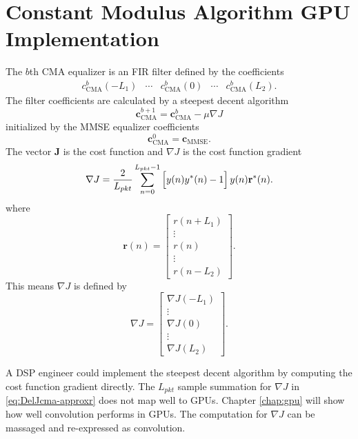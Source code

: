 \section{Constant Modulus Algorithm GPU Implementation}

The $b$th CMA equalizer is an FIR filter defined by the coefficients
\begin{equation}
\begin{matrix}
c_\text{CMA}^b(-L_1) & \cdots & c_\text{CMA}^b(0) & \cdots & c_\text{CMA}^b(L_2).
\end{matrix}
\end{equation}
The filter coefficients are calculated by a steepest decent algorithm 
\begin{equation}
\mathbf{c}_\text{CMA}^{b+1} = \mathbf{c}_\text{CMA}^{b}-\mu \nabla J
\label{eq:steepest}
\end{equation}
initialized by the MMSE equalizer coefficients
\begin{equation}
\mathbf{c}_\text{CMA}^0 = \mathbf{c}_\text{MMSE}.
\end{equation}
The vector $\mathbf{J}$ is the cost function and $\nabla J$ is the cost function gradient \cite[eq. (352)]{PAQ-phase1}
\begin{equation}
	\nabla J = \frac{2}{L_{pkt}} \sum_{n=0}^{L_{pkt}-1}
	\left[ \vphantom{\displaystyle\sum}  y(n) y^\ast(n) - 1 \right]
	y(n)  \mathbf{r}^\ast(n).
\label{eq:DelJcma-approxr}
\end{equation}
where
\begin{equation}
\mathbf{r}(n) = \begin{bmatrix} r(n+L_1) \\ \vdots \\ r(n) \\ \vdots \\ r(n-L_2) \end{bmatrix}.
\end{equation}
This means $\nabla J$ is defined by
\begin{equation}
\nabla J = \begin{bmatrix} \nabla J(-L_1) \\ \vdots \\ \nabla J(0) \\ \vdots \\ \nabla J(L_2) \end{bmatrix}.
\end{equation}

A DSP engineer could implement the steepest decent algorithm by computing the cost function gradient directly.
The $L_{pkt}$ sample summation for $\nabla J$ in \eqref{eq:DelJcma-approxr} does not map well to GPUs.
Chapter \ref{chap:gpu} will show how well convolution performs in GPUs.
The computation for $\nabla J$ can be massaged and re-expressed as convolution.

